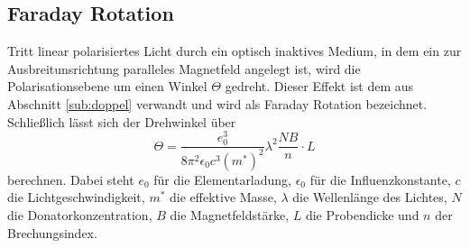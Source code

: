 \subsection{Faraday Rotation}
Tritt linear polarisiertes Licht durch ein optisch inaktives Medium, in dem ein zur Ausbreitunsrichtung paralleles Magnetfeld angelegt ist, wird die Polarisationsebene um einen Winkel $\Theta$ gedreht.
Dieser Effekt ist dem aus Abschnitt \ref{sub:doppel} verwandt und wird als Faraday Rotation bezeichnet.
Schließlich lässt sich der Drehwinkel über
\begin{equation}
    \Theta = \frac{e_0^3}{8\pi^2\epsilon_0c^3(m^*)^2}\lambda^2\frac{NB}{n} \cdot L
\end{equation}
berechnen.
Dabei steht $e_0$ für die Elementarladung, $\epsilon_0$ für die Influenzkonstante, $c$ die Lichtgeschwindigkeit,
$m^*$ die effektive Masse, $\lambda$ die Wellenlänge des Lichtes, $N$ die Donatorkonzentration,
$B$ die Magnetfeldstärke, $L$ die Probendicke und $n$ der Brechungsindex.


